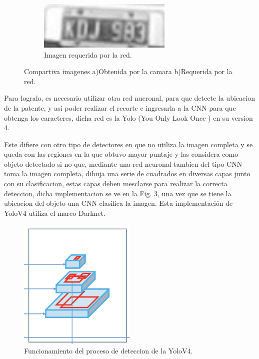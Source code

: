 \begin{figure}[!tbp]
\begin{subfigure}[b]{0.49\textwidth}
        \includegraphics[width=0.7\textwidth, height=0.7\textwidth]{imgs/imagen-requerida.jpg}
        \caption{Imagen requerida por la red.}
        \label{fig:imagen-requerida}
    \end{subfigure}
 \caption{Compartiva imagenes a)Obtenida por la camara b)Requerida por la red.}
 \label{fig:Comparativa-imagenes}
\end{figure}

Para logralo, es necesario utilizar otra red nueronal, para que detecte la ubicacion de la patente, y asi poder realizar el recorte e ingresarla 
a la CNN para que obtenga los caracteres, dicha red es la Yolo (You Only Look Once ) en su version 4. 

Este difiere con otro tipo de detectores en que no utiliza la imagen completa y se queda con las regiones en la que obtuvo mayor puntaje y las 
considera como objeto detectado si no que, mediante una red neuronal tambien del tipo CNN toma la imagen completa, dibuja una serie de cuadrados
en diversas capas junto con su clasificacion, estas capas deben mesclarse para realizar la correcta deteccion, dicha implementacion se ve en la 
Fig. \ref{fig:funcionamiento-yolo}, una vez que se tiene la ubicacion del objeto una CNN clasifica la imagen. Esta implementación de YoloV4 
utiliza el marco Darknet.
\begin{figure}
    \centering
    \includegraphics[width=0.5\textwidth]{imgs/funcionamiento-yolo.png}
    \caption{Funcionamiento del proceso de deteccion de la YoloV4.}
    \label{fig:funcionamiento-yolo}
\end{figure}

